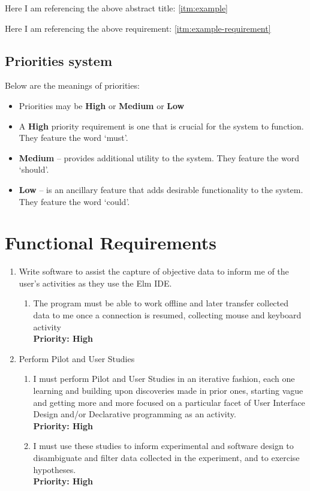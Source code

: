 \documentclass[11pt,openright,a4paper]{report}
\begin{document}
Here I am referencing the above abstract title: \ref{itm:example}

Here I am referencing the above requirement: \ref{itm:example-requirement}

\subsection{Priorities system}
Below are the meanings of priorities: 

\begin{itemize}
  \item Priorities may be \textbf{High} or \textbf{Medium} or \textbf{Low}
  \item A \textbf{High} priority requirement is one that is crucial for the system
    to function. They feature the word `must'.
  \item \textbf{Medium} -- provides additional utility to the
    system. They feature the word `should'.
  \item \textbf{Low} -- is an ancillary feature that adds
    desirable functionality to the system. They feature the word `could'.
\end{itemize}

\section{Functional Requirements}

\begin{enumerate}
  \item Write software to assist the capture of objective data to inform me of
	  the user's activities as they use the Elm IDE. 
  \label{itm:compile}
    \begin{enumerate}
      \item The program must be able to work offline and later transfer
	      collected data to me once a connection is resumed, collecting
	      mouse and keyboard activity\\
        \textbf{Priority: High}
      \label{itm:record}
    \end{enumerate}
  \item Perform Pilot and User Studies
    \begin{enumerate}
      \item I must perform Pilot and User Studies in an iterative fashion, each
	      one learning and building upon discoveries made in prior ones,
	      starting vague and getting more and more focused on a particular
	      facet of User Interface Design and/or Declarative programming as
	      an activity.\\
        \textbf{Priority: High}
      \item I must use these studies to inform experimental and software design
	      to disambiguate and filter data collected in the experiment, and
	      to exercise hypotheses.\\
        \textbf{Priority: High}
    \end{enumerate}
\end{enumerate}
\end{document}
